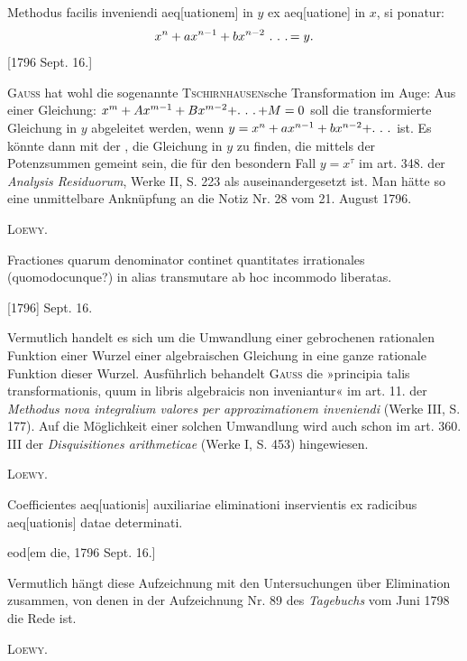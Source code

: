 \clearpage{}
\indent Methodus facilis inveniendi aeq[uationem] in \(y\) ex aeq[uatione] in \(x\), si ponatur:
\[
x^n+ax^{n-1}+bx^{n-2}\ \ldotp\,\ldotp\,\ldotp=y.
\]
\noindent\hfill[1796 Sept. 16.]

\medskip\begingroup\small
\indent \textsc{Gauss} hat wohl die sogenannte \textsc{Tschirnhausen}sche Transformation im Auge: Aus einer Gleichung: \(x^m+Ax^{m-1}+Bx^{m-2}+\ldotp\,\ldotp\,\ldotp+M=0\) soll die transformierte Gleichung in \(y\) abgeleitet werden, wenn \(y=x^n+ax^{n-1}+bx^{n-2}+\ldotp\,\ldotp\,\ldotp\) ist. Es könnte dann mit der , die Gleichung in \(y\) zu finden, die mittels der Potenzsummen gemeint sein, die für den besondern Fall \(y=x^\tau\) im art. 348. der \textit{Analysis Residuorum}, Werke II, S. 223 als  auseinandergesetzt ist. Man hätte so eine unmittelbare Anknüpfung an die Notiz Nr. 28 vom 21. August 1796.
\par\noindent\hfill\textsc{Loewy.}
\par\endgroup

\indent Fractiones quarum denominator continet quantitates irrationales (quomodocunque?) in alias transmutare ab hoc incommodo liberatas.
\par\noindent\hfill[1796] Sept. 16.

\medskip\begingroup\small
\indent Vermutlich handelt es sich um die Umwandlung einer gebrochenen rationalen Funktion einer Wurzel einer algebraischen Gleichung in eine ganze rationale Funktion dieser Wurzel. Ausführlich behandelt \textsc{Gauss} die »principia talis transformationis, quum in libris algebraicis non inveniantur« im art. 11. der \textit{Methodus nova integralium valores per approximationem inveniendi} (Werke III, S. 177). Auf die Möglichkeit einer solchen Umwandlung wird auch schon im art. 360. III der \textit{Disquisitiones arithmeticae} (Werke I, S. 453) hingewiesen.
\par\noindent\hfill\textsc{Loewy.}
\par\endgroup

\indent Coefficientes aeq[uationis] auxiliariae eliminationi inservientis ex radicibus aeq[uationis] datae determinati.
\par\noindent\hfill eod[em die, 1796 Sept. 16.]

\medskip\begingroup\small
\indent Vermutlich hängt diese Aufzeichnung mit den Untersuchungen über Elimination zusammen, von denen in der Aufzeichnung Nr. 89 des \textit{Tagebuchs} vom Juni 1798 die Rede ist.
\par\noindent\hfill\textsc{Loewy.}
\par\endgroup

